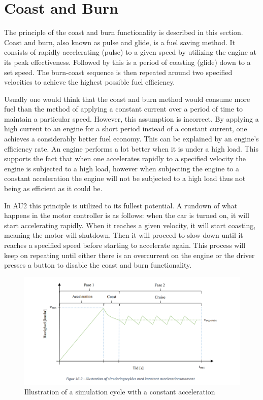 \section{Coast and Burn}
The principle of the coast and burn functionality is described in this section.
Coast and burn, also known as pulse and glide, is a fuel saving method. It consists of rapidly accelerating (pulse) to a given speed by utilizing the engine at its peak effectiveness. Followed by this is a period of coasting (glide) down to a set speed. The burn-coast sequence is then repeated around two specified velocities to achieve the highest possible fuel efficiency.

Usually one would think that the coast and burn method would consume more fuel than the method of applying a constant current over a period of time to maintain a particular speed. However, this assumption is incorrect. By applying a high current to an engine for a short period instead of a constant current, one achieves a considerably better fuel economy. This can be explained by an engine’s efficiency rate. An engine performs a lot better when it is under a high load. This supports the fact that when one accelerates rapidly to a specified velocity the engine is subjected to a high load, however when subjecting the engine to a constant acceleration the engine will not be subjected to a high load thus not being as efficient as it could be.

In AU2 this principle is utilized to its fullest potential. A rundown of what happens in the motor controller is as follows: when the car is turned on, it will start accelerating rapidly. When it reaches a given velocity, it will start coasting, meaning the motor will shutdown. Then it will proceed to slow down until it reaches a specified speed before starting to accelerate again. This process will keep on repeating until either there is an overcurrent on the engine or the driver presses a button to disable the coast and burn functionality.

\begin{figure}[H]
	\centering
	\includegraphics[width=1.0\linewidth]{Software/Coastburn.PNG}
	\caption[Empty]{Illustration of a simulation cycle with a constant acceleration\footnotemark}
	\label{fig:Coastburn}
\end{figure}
